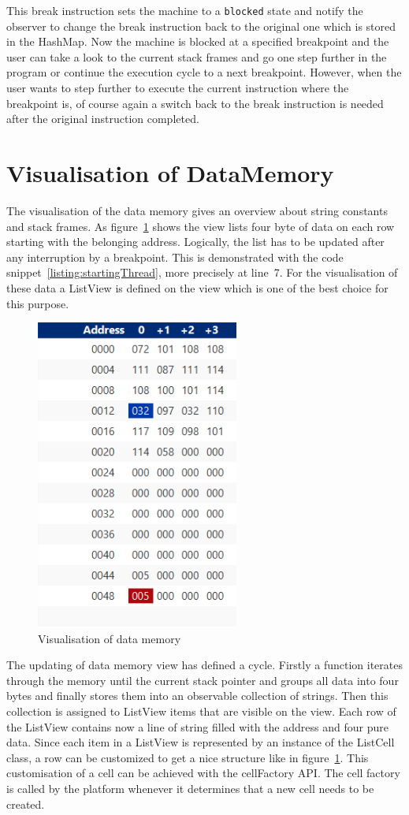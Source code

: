 This break instruction sets the machine to a \lstinline$blocked$ state and notify the observer to change the break instruction back to the original one which is stored in the HashMap. Now the machine is blocked at a specified breakpoint and the user can take a look to the current stack frames and go one step further in the program or continue the execution cycle to a next breakpoint. However, when the user wants to step further to execute the current instruction where the breakpoint is, of course again a switch back to the break instruction is needed after the original instruction completed.  
\section{Visualisation of DataMemory}
\label{sec:implementationOfDataVisualisation}
The visualisation of the data memory gives an overview about string constants and stack frames. As figure~\ref{fig:dataMemoryView} shows the view lists four byte of data on each row starting with the belonging address. Logically, the list has to be updated after any interruption by a breakpoint. This is demonstrated with the code snippet~\ref{listing:startingThread}, more precisely at line~7.
For the visualisation of these data a ListView is defined on the view which is one of the best choice for this purpose. 
\begin{figure}[h] 
	\centering
	\includegraphics[scale=.99]{images/dataMemory.png}
	\caption{Visualisation of data memory}
	\label{fig:dataMemoryView}
\end{figure}
The updating of data memory view has defined a cycle. Firstly a function iterates through the memory until the current stack pointer and groups all data into four bytes and finally stores them into an observable collection of strings. Then this collection is assigned to ListView items that are visible on the view. Each row of the ListView contains now a line of string filled with the address and four pure data. Since each item in a ListView is represented by an instance of the ListCell class, a row can be customized to get a nice structure like in figure~\ref{fig:dataMemoryView}. This customisation of a cell can be achieved with the cellFactory API. The cell factory is called by the platform whenever it determines that a new cell needs to be created. 
